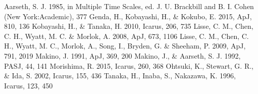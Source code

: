 \documentclass[a4paper,10pt,oneside,twocolumn,notitlepage,final]{jarticle}
\begin{document}
\small
\begin{thebibliography}{99}
 Aarseth, S. J. 1985, in Multiple Time Scales, ed. J. U. Brackbill and B. I. Cohen (New York:Academic), 377
 Genda, H., Kobayashi, H., \& Kokubo, E. 2015, ApJ, 810, 136
 Kobayashi, H., \& Tanaka, H. 2010, Icarus, 206, 735
 Lisse, C. M., Chen, C. H., Wyatt, M. C. \& Morlok, A. 2008, ApJ, 673, 1106
 Lisse, C. M., Chen, C. H., Wyatt, M. C., Morlok, A., Song, I., Bryden, G. \& Sheeham, P. 2009, ApJ, 791, 2019
 Makino, J. 1991, ApJ, 369, 200
 Makino, J., \& Aarseth, S. J. 1992, PASJ, 44, 141
 Morishima, R. 2015, Icarus, 260, 368
 Ohtsuki, K., Stewart, G. R., \& Ida, S. 2002, Icarus, 155, 436
 Tanaka, H., Inaba, S., Nakazawa, K. 1996, Icarus, 123, 450
\end{thebibliography}
\end{document}
